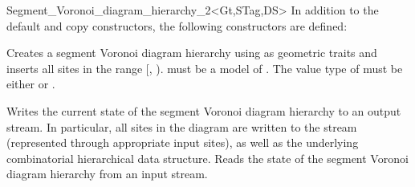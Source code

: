 \begin{ccRefClass}{Segment_Voronoi_diagram_hierarchy_2<Gt,STag,DS>}
In addition to the default and copy constructors, the following
constructors are defined:

%
\ccGlue
{}
{Creates a segment Voronoi diagram hierarchy using 
 as geometric traits and inserts all sites in the
range [, ).  must be a
  model of . The value type of 
  must be either  or .}
%

\ccThreeToTwo
%
{Writes the current state of the segment Voronoi diagram hierarchy to
  an output stream. In particular, all sites in the diagram are
  written to the stream (represented through appropriate input sites),
  as well as the underlying combinatorial hierarchical data structure.}
\ccGlue
{}
{Reads the state of the segment Voronoi diagram hierarchy from an
  input stream.}



\end{ccRefClass}
